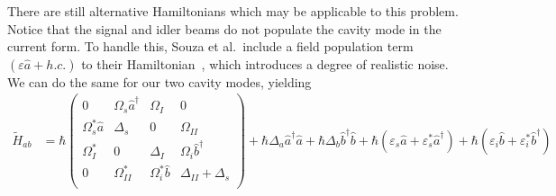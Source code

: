 \documentclass[aps,pra,showpacs,amsmath,amssymb,nofootinbib,longbibliography,superscriptaddress
]{revtex4-1}
\theoremstyle{definition}
\theoremstyle{remark}
\newcommand{\0}{\hat{0}}
\begin{document}
There are still alternative Hamiltonians which may be applicable to this problem. Notice that the signal and idler beams do not populate the cavity mode in the current form. To handle this, Souza et al.~include a field population term $(\varepsilon \hat{a} + h.c.)$ to their Hamiltonian~\cite{Souza}, which introduces a degree of realistic noise. We can do the same for our two cavity modes, yielding
\begin{align}\label{Hab}
    \tilde{H}_{ab}
    &=
    \hbar \left(
        \begin{array}{cccc}
            0 & \Omega_{s} \hat{a}^{\dagger} & \Omega_{I} & 0\\
            \Omega_{s}^* \hat{a} & \Delta_s & 0 & \Omega_{II}\\
            \Omega_{I}^* & 0 & \Delta_I & \Omega_{i} \hat{b}^{\dagger}\\
            0 & \Omega_{II}^* & \Omega_{i}^* \hat{b} & \Delta_{II} + \Delta_s\\
        \end{array}
    \right) +
    \hbar \Delta_a \hat{a}^{\dagger}\hat{a} +
    \hbar \Delta_b  \hat{b}^{\dagger}\hat{b} +
    \hbar \left(\varepsilon_s \hat{a} + \varepsilon_s^* \hat{a}^{\dagger}\right) +
    \hbar \left(\varepsilon_i \hat{b} + \varepsilon_i^* \hat{b}^{\dagger}\right)
\end{align}
\end{document}
